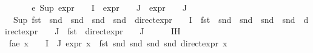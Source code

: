 \begin{isabellebody}
\ \ \isamarkupfalse%
\isanewline
\ \ \isamarkupfalse%
\ e{}{\isacharcolon}{\kern0pt}\ {\isachardoublequoteopen}{\isacharparenleft}{\kern0pt}Sup\ {\isacharparenleft}{\kern0pt}{\isacharparenleft}{\kern0pt}expr{\isacharunderscore}{\kern0pt}{}\ {\isasymcirc}\ {\isasymPhi}{\isacharparenright}{\kern0pt}\ {\isacharbackquote}{\kern0pt}\ I\ {\isasymunion}\ {\isacharparenleft}{\kern0pt}expr{\isacharunderscore}{\kern0pt}{}\ {\isasymcirc}\ {\isasymPhi}{\isacharparenright}{\kern0pt}\ {\isacharbackquote}{\kern0pt}\ J\ {\isasymunion}\ {\isacharparenleft}{\kern0pt}expr{\isacharunderscore}{\kern0pt}{}\ {\isasymcirc}\ {\isasymPhi}{\isacharparenright}{\kern0pt}\ {\isacharbackquote}{\kern0pt}\ J{\isacharparenright}{\kern0pt}{\isacharparenright}{\kern0pt}\ {\isacharequal}{\kern0pt}\isanewline
\ \ {\isacharparenleft}{\kern0pt}Sup\ {\isacharparenleft}{\kern0pt}{\isacharparenleft}{\kern0pt}fst\ {\isasymcirc}\ snd\ {\isasymcirc}\ snd\ {\isasymcirc}\ snd\ {\isasymcirc}\ snd\ {\isasymcirc}\ direct{\isacharunderscore}{\kern0pt}expr\ {\isasymcirc}\ {\isasymPhi}{\isacharparenright}{\kern0pt}\ {\isacharbackquote}{\kern0pt}\ I\ {\isasymunion}\ {\isacharparenleft}{\kern0pt}fst\ {\isasymcirc}\ snd\ {\isasymcirc}\ snd\ {\isasymcirc}\ snd\ {\isasymcirc}\ snd\ {\isasymcirc}\ direct{\isacharunderscore}{\kern0pt}expr\ {\isasymcirc}\ {\isasymPhi}{\isacharparenright}{\kern0pt}\ {\isacharbackquote}{\kern0pt}\ J\ {\isasymunion}\ {\isacharparenleft}{\kern0pt}fst\ {\isasymcirc}\ direct{\isacharunderscore}{\kern0pt}expr\ {\isasymcirc}\ {\isasymPhi}{\isacharparenright}{\kern0pt}\ {\isacharbackquote}{\kern0pt}\ J{\isacharparenright}{\kern0pt}{\isacharparenright}{\kern0pt}{\isachardoublequoteclose}\isanewline
\ \ \ \ \isamarkupfalse%
\ IH\isanewline
\ \ \isamarkupfalse%
{\isacharminus}{\kern0pt}\isanewline
\ \ \ \ \isamarkupfalse%
\ fa{\isacharunderscore}{\kern0pt}e{}{\isacharcolon}{\kern0pt}\ {\isachardoublequoteopen}{\isasymforall}x\ {\isasymin}\ {\isasymPhi}\ {\isacharbackquote}{\kern0pt}\ {\isacharparenleft}{\kern0pt}I\ {\isasymunion}\ J{\isacharparenright}{\kern0pt}{\isachardot}{\kern0pt}\ expr{\isacharunderscore}{\kern0pt}{}\ x\ {\isacharequal}{\kern0pt}\ fst\ {\isacharparenleft}{\kern0pt}snd\ {\isacharparenleft}{\kern0pt}snd\ {\isacharparenleft}{\kern0pt}snd\ {\isacharparenleft}{\kern0pt}snd\ {\isacharparenleft}{\kern0pt}direct{\isacharunderscore}{\kern0pt}expr\ x{\isacharparenright}{\kern0pt}{\isacharparenright}{\kern0pt}{\isacharparenright}{\kern0pt}{\isacharparenright}{\kern0pt}{\isacharparenright}{\kern0pt}{\isachardoublequoteclose}\isanewline

\end{isabellebody}
